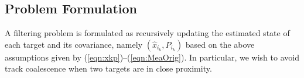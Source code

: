 \documentclass[letterpaper, 10pt, conference]{ieeeconf}
\newcommand{\refeqn}[1]{(\ref{eqn:#1})}
\newcommand{\EditTL}[1]{{\color{red}\protect #1}}
\renewcommand{\EditTL}[1]{{\protect #1}}
\begin{document}
%

\subsection{Problem Formulation}

A filtering problem is formulated as recursively updating the estimated state of each target and its covariance, namely $(\hat x_{i_k}, P_{i_k})$ based on the above assumptions given by \refeqn{xkp}--\refeqn{MeaOrig}. In particular, we wish to avoid track coalescence when two targets are in close proximity. 



\end{document}

